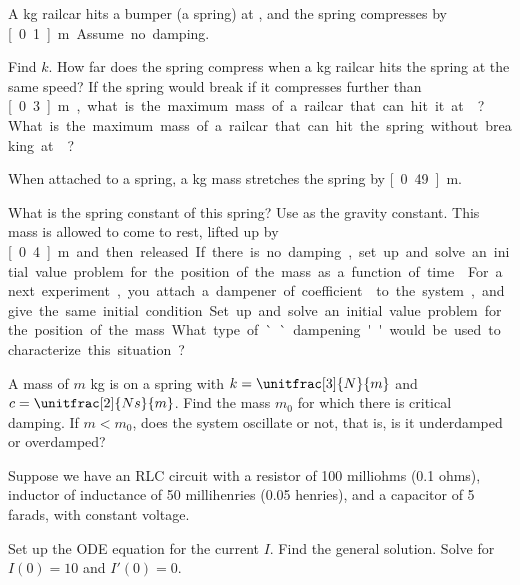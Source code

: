 \begin{exercise}\ansMark%
\pagebreak[2]
A \unit[5000]{kg} railcar hits a bumper (a spring) at ,
and the spring compresses by \unit[0.1]{m}.  Assume no damping.
\begin{tasks}
\task Find $k$.
\task How far does the spring compress when a
\unit[10000]{kg} railcar hits the spring at the same speed?
\task If the spring
would break if it compresses further than \unit[0.3]{m}, what is the maximum
mass of a railcar that can hit it at ?
\task What is
the maximum mass of a railcar that can hit the spring without breaking
at ?
\end{tasks}
\end{exercise}

\begin{exercise}
When attached to a spring, a \unit[2]{kg} mass stretches the spring by \unit[0.49]{m}. 
\begin{tasks}
\task What is the spring constant of this spring? Use  as the gravity constant.  
\task This mass is allowed to come to rest, lifted up by \unit[0.4]{m} and then released. If there is no damping, set up and solve an initial value problem for the position of the mass as a function of time.
\task For a next experiment, you attach a dampener of coefficient  to the system, and give the same initial condition. Set up and solve an initial value problem for the position of the mass. What type of ``dampening'' would be used to characterize this situation?
\end{tasks}
\end{exercise}

\begin{exercise}\ansMark%
A mass of $m$ \unit{kg} is on a spring with $k=\unitfrac[3]{N}{m}$ and
$c=\unitfrac[2]{Ns}{m}$.  Find the mass $m_0$ for which there is critical
damping.  If $m < m_0$, does the system oscillate or not, that is, is it
underdamped or overdamped?
\end{exercise}

\begin{exercise}\ansMark%
Suppose we have an RLC circuit with a resistor of 100 milliohms (0.1 ohms),
inductor of inductance of 50 millihenries (0.05 henries), and a capacitor of 5 farads, with
constant voltage.
\begin{tasks}
\task Set up the ODE equation for the current $I$.
\task Find the general solution.
\task Solve for $I(0) = 10$ and $I'(0) = 0$.
\end{tasks}
\end{exercise}

